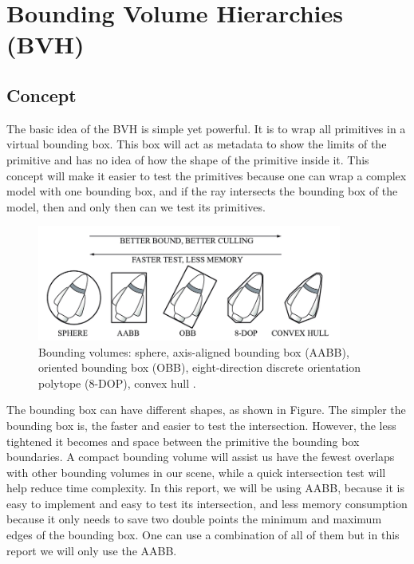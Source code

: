 \documentclass[11pt,a4paper]{article}
\begin{document}
\clearpage

\section{Bounding Volume Hierarchies (BVH)}
\subsection{Concept}
The basic idea of the BVH is simple yet powerful. It is to wrap all primitives in a virtual bounding box. This box will act as metadata to show the limits of the primitive and has no idea of how the shape of the primitive inside it. This concept will make it easier to test the primitives because one can wrap a complex model with one bounding box, and if the ray intersects the bounding box of the model, then and only then can we test its primitives.



\begin{figure}[h]	
     \centering
         \includegraphics[width=10cm]{images/bvs.png}
        \caption{Bounding volumes: sphere, axis-aligned bounding box (AABB), oriented bounding box (OBB), eight-direction discrete orientation polytope (8-DOP), convex hull . \protect\cite{Ericson2004}}
        \label{fig:dice}
\end{figure}

The bounding box can have different shapes, as shown in Figure. The simpler the bounding box is, the faster and easier to test the intersection. However, the less tightened it becomes and space between the primitive the bounding box boundaries. A compact bounding volume will assist us have the fewest overlaps with other bounding volumes in our scene, while a quick intersection test will help reduce time complexity. In this report, we will be using AABB, because it is easy to implement and easy to test its intersection, and less memory consumption because it only needs to save two double points the minimum and maximum edges of the bounding box. One can use a combination of all of them but in this report we will only use the AABB. 
\end{document}
